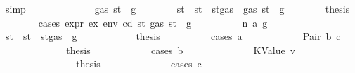\begin{isabellebody}
\ simp\isanewline
\ \ \ \ \isamarkupfalse%
\isanewline
\ \ \ \ \ \ \isamarkupfalse%
\ {\isachardoublequoteopen}{\isasymnot}\ gas\ st\ {\isasymle}\ g{\isachardoublequoteclose}\isanewline
\ \ \ \ \ \ \isamarkupfalse%
\ st{\isacharprime}{\kern0pt}\ \ {\isachardoublequoteopen}st{\isacharprime}{\kern0pt}\ {\isacharequal}{\kern0pt}\ st{\isasymlparr}gas\ {\isacharcolon}{\kern0pt}{\isacharequal}{\kern0pt}\ gas\ st\ {\isacharminus}{\kern0pt}\ g{\isasymrparr}{\isachardoublequoteclose}\isanewline
\ \ \ \ \ \ \isamarkupfalse%
\ {\isacharquery}{\kern0pt}thesis\isanewline
\ \ \ \ \ \ \isamarkupfalse%
\ {\isacharparenleft}{\kern0pt}cases\ {\isachardoublequoteopen}expr\ ex\ env\ cd\ st{\isacharprime}{\kern0pt}\ {\isacharparenleft}{\kern0pt}gas\ st\ {\isacharminus}{\kern0pt}\ g{\isacharparenright}{\kern0pt}{\isachardoublequoteclose}{\isacharparenright}{\kern0pt}\isanewline
\ \ \ \ \ \ \ \ \isamarkupfalse%
\ {\isacharparenleft}{\kern0pt}n\ a\ g{\isacharprime}{\kern0pt}{\isacharparenright}{\kern0pt}\isanewline
\ \ \ \ \ \ \ \ \isamarkupfalse%
\ st{\isacharprime}{\kern0pt}{\isacharprime}{\kern0pt}\ \ {\isachardoublequoteopen}st{\isacharprime}{\kern0pt}{\isacharprime}{\kern0pt}\ {\isacharequal}{\kern0pt}\ st{\isacharprime}{\kern0pt}{\isasymlparr}gas\ {\isacharcolon}{\kern0pt}{\isacharequal}{\kern0pt}\ g{\isacharprime}{\kern0pt}{\isasymrparr}{\isachardoublequoteclose}\isanewline
\ \ \ \ \ \ \ \ \isamarkupfalse%
\ \isamarkupfalse%
\ {\isacharquery}{\kern0pt}thesis\isanewline
\ \ \ \ \ \ \ \ \isamarkupfalse%
\ {\isacharparenleft}{\kern0pt}cases\ a{\isacharparenright}{\kern0pt}\isanewline
\ \ \ \ \ \ \ \ \ \ \isamarkupfalse%
\ {\isacharparenleft}{\kern0pt}Pair\ b\ c{\isacharparenright}{\kern0pt}\isanewline
\ \ \ \ \ \ \ \ \ \ \isamarkupfalse%
\ \isamarkupfalse%
\ {\isacharquery}{\kern0pt}thesis\isanewline
\ \ \ \ \ \ \ \ \ \ \isamarkupfalse%
\ {\isacharparenleft}{\kern0pt}cases\ b{\isacharparenright}{\kern0pt}\isanewline
\ \ \ \ \ \ \ \ \ \ \ \ \isamarkupfalse%
\ {\isacharparenleft}{\kern0pt}KValue\ v{\isacharparenright}{\kern0pt}\isanewline
\ \ \ \ \ \ \ \ \ \ \ \ \isamarkupfalse%
\ \isamarkupfalse%
\ {\isacharquery}{\kern0pt}thesis\isanewline
\ \ \ \ \ \ \ \ \ \ \ \ \isamarkupfalse%
\ {\isacharparenleft}{\kern0pt}cases\ c{\isacharparenright}{\kern0pt}\isanewline

\end{isabellebody}
